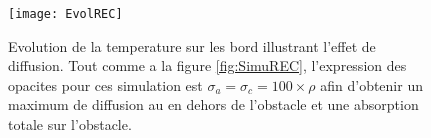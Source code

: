 \begin{figure}[!h]
\centering
\texttt{[image: EvolREC]} 
\decoRule
\caption[EvolREC]{Evolution de la temperature sur les bord illustrant l'effet de diffusion. Tout comme a la figure \ref{fig:SimuREC}, l'expression des opacites pour ces simulation est $\sigma_a = \sigma_c = 100 \times \rho$ afin d'obtenir un maximum de diffusion au en dehors de l'obstacle et une absorption totale sur l'obstacle.}
\label{fig:EvolREC}
\end{figure}

